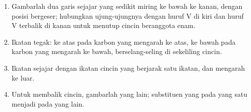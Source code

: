 \begin{method}\label{met:b1:stereochemistry-in-depth:draw-chair}
\begin{enumerate}
  \item Gambarlah dua garis sejajar yang sedikit miring ke bawah ke kanan,
        dengan posisi bergeser; hubungkan ujung-ujungnya dengan huruf V di
        kiri dan huruf V terbalik di kanan untuk menutup cincin beranggota
        enam.
  \item Ikatan  tegak: ke atas pada karbon yang mengarah ke atas, ke
        bawah pada karbon yang mengarah ke bawah, berselang-seling di
        sekeliling cincin.
  \item Ikatan  sejajar dengan ikatan cincin yang berjarak satu
        ikatan, dan mengarah ke luar.
  \item Untuk membalik cincin, gambarlah  yang lain; substituen yang
         pada  yang satu menjadi  pada  yang
        lain.
\end{enumerate}
\end{method}

